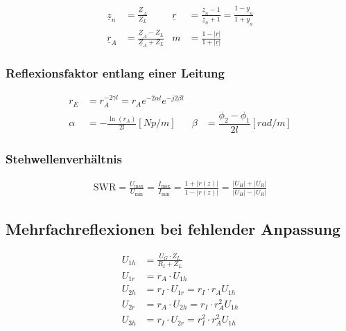 \begin{align*}
    \underline{z}_n & = \frac{\underline{Z}_A}{Z_L}                     & \underline{r} & = \frac{\underline{z}_n-1}{\underline{z}_n+1}= \frac{1-\underline{y}_n}{1+\underline{y}_n} \\
    \underline{r}_A & = \frac{\underline{Z}_A-Z_L}{\underline{Z}_A+Z_L} & m             & = \frac{1-|\underline{r}|}{1+|\underline{r}|}
\end{align*}

\subsubsection{Reflexionsfaktor entlang einer Leitung}
\begin{align*}
    r_E    & = r_A  ^{-2\gamma l} = r_A  e^{-2\alpha l} e^{-j2\beta l}                                                     \\
    \alpha & = -\frac{\ln(r_A)}{2l} [\si{Np/m}]                        & \beta & = \dfrac{\phi_2 -\phi_1}{2l} [\si{rad/m}]
\end{align*}

\subsubsection{Stehwellenverhältnis}
\begin{align*}
    \mathrm{SWR} = \frac{U_\text{max}}{U_\text{min}} =
    \frac{I_\text{max}}{I_\text{min}} = \frac{1+|r(z)|}{1-|r(z)|} =
    \frac{|U_H|+|U_R|}{|U_H|-|U_R|}
\end{align*}

\subsection{Mehrfachreflexionen bei fehlender Anpassung}


\begin{align*}
    U_{1h} & = \frac{U_G\cdot Z_L}{R_I + Z_L}            \\
    U_{1r} & = r_A\cdot U_{1h}                           \\
    U_{2h} & = r_I\cdot U_{1r} = r_I\cdot r_A U_{1h}     \\
    U_{2r} & = r_A\cdot U_{2h} = r_I\cdot r_A^2 U_{1h}   \\
    U_{3h} & = r_I\cdot U_{2r} = r_I^2\cdot r_A^2 U_{1h}
\end{align*}

